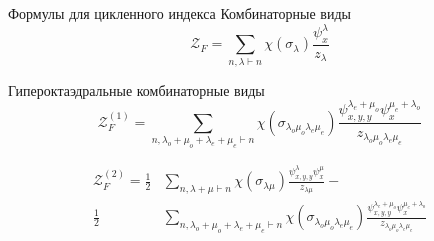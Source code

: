 \documentclass{beamer}
\begin{document}
\begin{frame}{Формулы для цикленного индекса}
Комбинаторные виды
$$
\mathcal Z_F = 
\sum_{n, \lambda \vdash n}\chi(\sigma_{\lambda})
\frac{\psi_{x}^{\lambda}}{z_{\lambda}}
$$

Гипероктаэдральные комбинаторные виды
\begin{equation}
\mathcal Z_F^{(1)} = 
\sum_{n, \lambda_o + \mu_o + \lambda_e + \mu_e \vdash
n}\chi(\sigma_{\lambda_o \mu_o \lambda_e \mu_e})
\frac{\psi_{x, y, y}^{\lambda_e + \mu_o} \psi_{x}^{\mu_e + 
\lambda_o}}{z_{\lambda_o \mu_o \lambda_e \mu_e}}
\end{equation}

\begin{equation}
\begin{split}
\mathcal Z_F^{(2)} = 
\frac{1}{2}&
\sum_{n, \lambda + \mu \vdash n}\chi(\sigma_{\lambda \mu})
\frac{\psi_{x, y, y}^{\lambda} \psi_{x}^{\mu}}{z_{\lambda \mu}}
- \\
\frac{1}{2}&
\sum_{n, \lambda_o + \mu_o + \lambda_e + \mu_e \vdash
n}\chi(\sigma_{\lambda_o \mu_o \lambda_e \mu_e})
\frac{\psi_{x, y, y}^{\lambda_e + \mu_o} \psi_{x}^{\mu_e + 
\lambda_o}}{z_{\lambda_o \mu_o \lambda_e \mu_e}}
\end{split}
\end{equation}

\end{frame}
\end{document}
